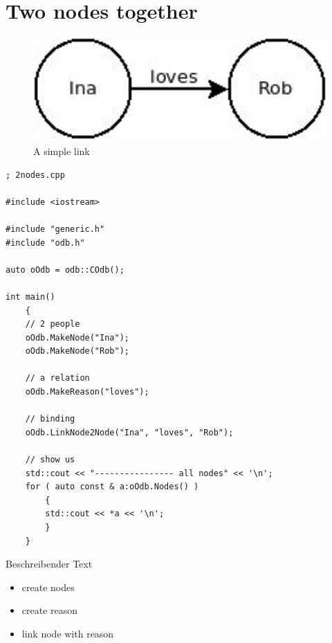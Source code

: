 \section{Two nodes together}

\begin{figure}[htbp]
    \centering
    \includegraphics[width=120mm]{./P1.start/01_node-to-node.jpeg}
    \caption{A simple link}
    \label{odb2Nodes}
\end{figure}


\begin{lstlisting}
; 2nodes.cpp

#include <iostream>

#include "generic.h"
#include "odb.h"

auto oOdb = odb::COdb();

int main()
    {
    // 2 people
    oOdb.MakeNode("Ina");
    oOdb.MakeNode("Rob");
    
    // a relation
    oOdb.MakeReason("loves");
    
    // binding
    oOdb.LinkNode2Node("Ina", "loves", "Rob");
    
    // show us
    std::cout << "---------------- all nodes" << '\n';
    for ( auto const & a:oOdb.Nodes() )
        {
        std::cout << *a << '\n';
        }
    }
\end{lstlisting}

Beschreibender Text

\begin{itemize}
\item  create nodes
\item  create reason
\item  link node with reason
\end{itemize}


